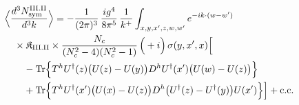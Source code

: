 \begingroup\small
\begin{align}\label{eq:S-III.II-3}
&\Big\langle\frac{d^{3}N^{\rm III.II}_{{\rm sym}}}{d^{3}k}\Big\rangle=-\frac{1}{(2\pi)^{3}}\, \frac{ig^{4}}{8\pi^{5}}\, \frac{1}{k^{+}} \int_{x,y,x',z,w,w'}e^{-ik\cdot(w-w')}\notag\\
&\quad \times \mathfrak{K}_{\rm III.II} \times \frac{N_{c}}{(N_{c}^{2}-4)(N_{c}^{2}-1)}\, \Big(+i\Big)\, \sigma(y,x',x)\Big[\notag\\
&\quad\quad -{\rm Tr}\Big\{T^{h}U^{\dagger}(z)\big(U(z)-U(y)\big)D^{h}U^{\dagger}(x')\big(U(w)-U(z)\big)\Big\}\notag\\
&\quad\quad +{\rm Tr}\Big\{T^{h}U^{\dagger}(x')\big(U(x)-U(z)\big)D^{h}\big(U^{\dagger}(z)-U^{\dagger}(y)\big)U(x')\Big\}\Big] +{\rm c.c.}
\end{align}
\endgroup
